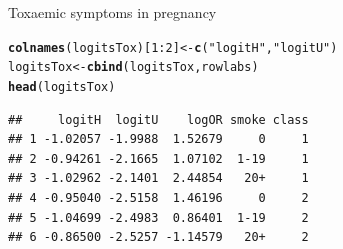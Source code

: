\documentclass[11pt]{book}\usepackage[]{graphicx}\usepackage[]{color}
\makeatletter
\newcommand{\hlnum}[1]{\textcolor[rgb]{0.686,0.059,0.569}{#1}}%
\newcommand{\hlstr}[1]{\textcolor[rgb]{0.192,0.494,0.8}{#1}}%
\newcommand{\hlopt}[1]{\textcolor[rgb]{0,0,0}{#1}}%
\newcommand{\hlstd}[1]{\textcolor[rgb]{0.345,0.345,0.345}{#1}}%
\newcommand{\hlkwb}[1]{\textcolor[rgb]{0.69,0.353,0.396}{#1}}%
\newcommand{\hlkwd}[1]{\textcolor[rgb]{0.737,0.353,0.396}{\textbf{#1}}}%
\newenvironment{kframe}{%
 \def\at@end@of@kframe{}%
 \ifinner\ifhmode%
  \def\at@end@of@kframe{\end{minipage}}%
  \begin{minipage}{\columnwidth}%
 \fi\fi%
 \def\FrameCommand##1{\hskip\@totalleftmargin \hskip-\fboxsep
 \colorbox{shadecolor}{##1}\hskip-\fboxsep
     \hskip-\linewidth \hskip-\@totalleftmargin \hskip\columnwidth}%
 \MakeFramed {\advance\hsize-\width
   \@totalleftmargin\z@ \linewidth\hsize
   \@setminipage}}%
 {\par\unskip\endMakeFramed%
 \at@end@of@kframe}
\newenvironment{knitrout}{}{} %
\renewenvironment{knitrout}{\small\renewcommand{\baselinestretch}{.85}}{} %
\makeatother
\begin{document}
\begin{Example}[toxaemia]{Toxaemic symptoms in pregnancy}
\begin{knitrout}
\begin{kframe}
\begin{alltt}
\hlkwd{colnames}\hlstd{(logitsTox)[}\hlnum{1}\hlopt{:}\hlnum{2}\hlstd{]} \hlkwb{<-} \hlkwd{c}\hlstd{(}\hlstr{"logitH"}\hlstd{,} \hlstr{"logitU"}\hlstd{)}
\hlstd{logitsTox} \hlkwb{<-} \hlkwd{cbind}\hlstd{(logitsTox, rowlabs)}
\hlkwd{head}\hlstd{(logitsTox)}
\end{alltt}
\begin{verbatim}
##     logitH  logitU    logOR smoke class
## 1 -1.02057 -1.9988  1.52679     0     1
## 2 -0.94261 -2.1665  1.07102  1-19     1
## 3 -1.02962 -2.1401  2.44854   20+     1
## 4 -0.95040 -2.5158  1.46196     0     2
## 5 -1.04699 -2.4983  0.86401  1-19     2
## 6 -0.86500 -2.5257 -1.14579   20+     2
\end{verbatim}
\end{kframe}
\end{knitrout}


\end{Example}
\end{document}
